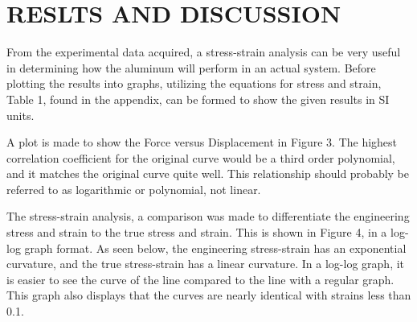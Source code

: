 \documentclass[12pt]{article}
\begin{document}






\section*{\fontsize{12}{12}\selectfont RESLTS AND DISCUSSION}
From the experimental data acquired, a stress-strain analysis can be very useful in determining how the aluminum will perform in an actual system. Before plotting the results into graphs, utilizing the equations for stress and strain, Table 1, found in the appendix, can be formed to show the given results in SI units.
\bigskip


\newpage




A plot is made to show the Force versus Displacement in Figure 3. The highest correlation coefficient for the original curve would be a third order polynomial, and it matches the original curve quite well. This relationship should probably be referred to as logarithmic or polynomial, not linear. 
\bigskip





\clearpage

The stress-strain analysis, a comparison was made to differentiate the engineering stress and strain to the true stress and strain. This is shown in Figure 4, in a log-log graph format. As seen below, the engineering stress-strain has an exponential curvature, and the true stress-strain has a linear curvature. In a log-log graph, it is easier to see the curve of the line compared to the line with a regular graph. This graph also displays that the curves are nearly identical with strains less than 0.1. 
\bigskip
\end{document}
